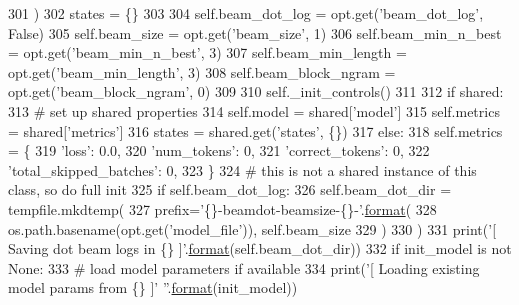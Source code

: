 \begin{DoxyCode}
301         )
302         states = \{\}
303 
304         self.beam\_dot\_log = opt.get(\textcolor{stringliteral}{'beam\_dot\_log'}, \textcolor{keyword}{False})
305         self.beam\_size = opt.get(\textcolor{stringliteral}{'beam\_size'}, 1)
306         self.beam\_min\_n\_best = opt.get(\textcolor{stringliteral}{'beam\_min\_n\_best'}, 3)
307         self.beam\_min\_length = opt.get(\textcolor{stringliteral}{'beam\_min\_length'}, 3)
308         self.beam\_block\_ngram = opt.get(\textcolor{stringliteral}{'beam\_block\_ngram'}, 0)
309 
310         self.\_init\_controls()
311 
312         \textcolor{keywordflow}{if} shared:
313             \textcolor{comment}{# set up shared properties}
314             self.model = shared[\textcolor{stringliteral}{'model'}]
315             self.metrics = shared[\textcolor{stringliteral}{'metrics'}]
316             states = shared.get(\textcolor{stringliteral}{'states'}, \{\})
317         \textcolor{keywordflow}{else}:
318             self.metrics = \{
319                 \textcolor{stringliteral}{'loss'}: 0.0,
320                 \textcolor{stringliteral}{'num\_tokens'}: 0,
321                 \textcolor{stringliteral}{'correct\_tokens'}: 0,
322                 \textcolor{stringliteral}{'total\_skipped\_batches'}: 0,
323             \}
324             \textcolor{comment}{# this is not a shared instance of this class, so do full init}
325             \textcolor{keywordflow}{if} self.beam\_dot\_log:
326                 self.beam\_dot\_dir = tempfile.mkdtemp(
327                     prefix=\textcolor{stringliteral}{'\{\}-beamdot-beamsize-\{\}-'}.\hyperlink{namespaceparlai_1_1chat__service_1_1services_1_1messenger_1_1shared__utils_a32e2e2022b824fbaf80c747160b52a76}{format}(
328                         os.path.basename(opt.get(\textcolor{stringliteral}{'model\_file'})), self.beam\_size
329                     )
330                 )
331                 print(\textcolor{stringliteral}{'[ Saving dot beam logs in \{\} ]'}.\hyperlink{namespaceparlai_1_1chat__service_1_1services_1_1messenger_1_1shared__utils_a32e2e2022b824fbaf80c747160b52a76}{format}(self.beam\_dot\_dir))
332             \textcolor{keywordflow}{if} init\_model \textcolor{keywordflow}{is} \textcolor{keywordflow}{not} \textcolor{keywordtype}{None}:
333                 \textcolor{comment}{# load model parameters if available}
334                 print(\textcolor{stringliteral}{'[ Loading existing model params from \{\} ]'} \textcolor{stringliteral}{''}.\hyperlink{namespaceparlai_1_1chat__service_1_1services_1_1messenger_1_1shared__utils_a32e2e2022b824fbaf80c747160b52a76}{format}(init\_model))

\end{DoxyCode}
